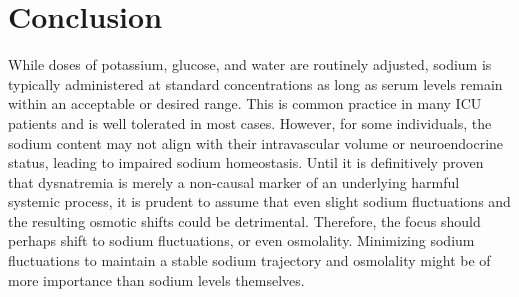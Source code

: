\section{Conclusion}
While doses of potassium, glucose, and water are routinely adjusted, sodium is typically administered at standard concentrations as long as serum levels remain within an acceptable or desired range. This is common practice in many ICU patients and is well tolerated in most cases. However, for some individuals, the sodium content may not align with their intravascular volume or neuroendocrine status, leading to impaired sodium homeostasis. Until it is definitively proven that dysnatremia is merely a non-causal marker of an underlying harmful systemic process, it is prudent to assume that even slight sodium fluctuations and the resulting osmotic shifts could be detrimental. Therefore, the focus should perhaps shift to sodium fluctuations, or even osmolality. Minimizing sodium fluctuations to maintain a stable sodium trajectory and osmolality might be of more importance than sodium levels themselves.





